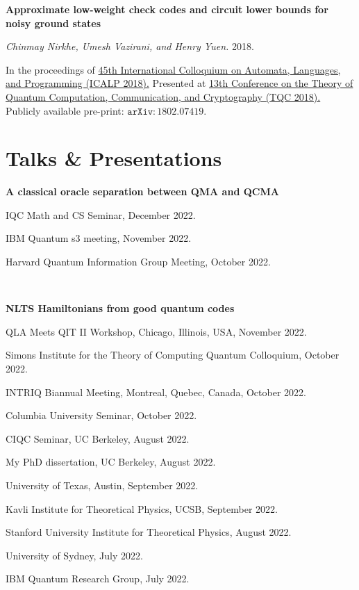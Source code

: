 \documentclass[11pt]{article}
\begin{document}
\begin{enumerate}[{leftmargin=*,start=10,label=[\arabic*]\addtocounter{enumi}{-2}}]
\item \textbf{Approximate low-weight check codes and circuit lower bounds for noisy ground states}

\emph{Chinmay Nirkhe, Umesh Vazirani, and Henry Yuen.} 2018.

In the proceedings of \href{http://drops.dagstuhl.de/opus/volltexte/2018/9095/}{45th International Colloquium on Automata, Languages, and Programming (ICALP 2018).} 
Presented at \href{https://www.tqc2018.org/}{13th Conference on the Theory of Quantum Computation, Communication, and Cryptography (TQC 2018).}
Publicly available pre-print: \href{https://arxiv.org/abs/1802.07419}{$\mathtt{arXiv:1802.07419}$}.

\end{enumerate}


\section{Talks \& Presentations}

\textbf{A classical oracle separation between QMA and QCMA}

IQC Math and CS Seminar, December 2022.

IBM Quantum s3 meeting, November 2022.

Harvard Quantum Information Group Meeting, October 2022.

\

\textbf{NLTS Hamiltonians from good quantum codes}

QLA Meets QIT II Workshop, Chicago, Illinois, USA, November 2022.

Simons Institute for the Theory of Computing Quantum Colloquium, October 2022.

INTRIQ Biannual Meeting, Montreal, Quebec, Canada, October 2022.

Columbia University Seminar, October 2022.

CIQC Seminar, UC Berkeley, August 2022.

My PhD dissertation, UC Berkeley, August 2022.

University of Texas, Austin, September 2022.

Kavli Institute for Theoretical Physics, UCSB, September 2022.

Stanford University Institute for Theoretical Physics, August 2022.

University of Sydney, July 2022.

IBM Quantum Research Group, July 2022.

\
\end{document}
